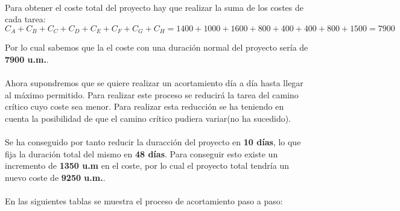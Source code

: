 \documentclass[10pt, a4paper,spanish]{article}
\begin{document}
	\paragraph{}
	Para obtener el coste total del proyecto hay que realizar la suma de los costes de cada tarea:
	\[
	C_A + C_B + C_C + C_D + C_E + C_F + C_G + C_H = 1400 + 1000 + 1600 + 800 + 400 + 400 + 800 + 1500 = 7900
	\]

		Por lo cual sabemos que la el coste con una duración normal del proyecto sería de \textbf{7900 u.m.}.

	\paragraph{}
	Ahora supondremos que se quiere realizar un acortamiento día a día hasta llegar al máximo permitido. Para realizar este proceso se reducirá la tarea del camino crítico cuyo coste sea menor. Para realizar esta reducción se ha teniendo en cuenta la posibilidad de que el camino crítico pudiera variar(no ha sucedido).

	\paragraph{}
	Se ha conseguido por tanto reducir la duracción del proyecto en \textbf{10 días}, lo que fija la duración total del mismo en \textbf{48 días}. Para conseguir esto existe un incremento de \textbf{1350 u.m} en el coste, por lo cual el proyecto total tendría un nuevo coste de \textbf{9250 u.m.}.

	\paragraph{}
	En las siguientes tablas se muestra el proceso de acortamiento paso a paso:
	\break
\end{document}
